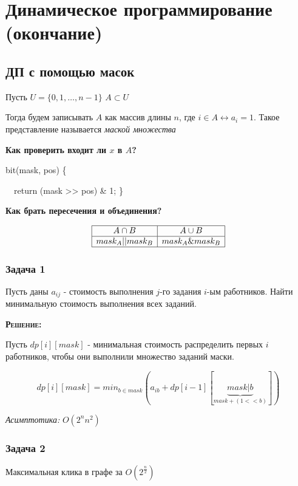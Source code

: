 
\section{Динамическое программирование (окончание)}

\subsection{ДП с помощью масок}
Пусть \(U = \{0, 1, \dots, n-1\}\) $A \subset U$

Тогда будем записывать $A$ как массив длины $n$, где $i \in A \leftrightarrow a_i = 1$. Такое представление называется \textit{маской множества}

\textbf{Как проверить входит ли $x$ в $A$?}
\begin{center}
   bit(mask, pos) \{ \ \ \ \ \ \ \ \ \ \ \ \ \ \ \ \ \ 

     \ \ return (mask >> pos) \& 1; \}
\end{center}

\textbf{Как брать пересечения и объединения?}

$$\begin{array}{|c|c|}
  \hline
  A \cap B & A \cup B \\
  \hline
   mask_{A} || mask_{B} &  mask_{A} \& mask_{B}\\
   \hline
\end{array}$$

\subsubsection{Задача 1} 

Пусть даны $a_{ij}$ - стоимость выполнения $j$-го задания $i$-ым работников.
Найти минимальную стоимость выполнения всех заданий.

\textsc{\textbf{Решение:}}

Пусть $dp[i][mask]$ - минимальная стоимость распределить первых $i$ работников, чтобы они выполнили множество заданий маски.

$$dp[i][mask] = min_{b \in mask}(a_{ib} + dp[i-1][\underbrace{mask | b}_{mask + (1 << b)}])$$

\textit{Асимптотика:} $O(2^n n^2)$

\subsubsection{Задача 2} Максимальная клика в графе за $O(2^{\frac{n}{2}})$

